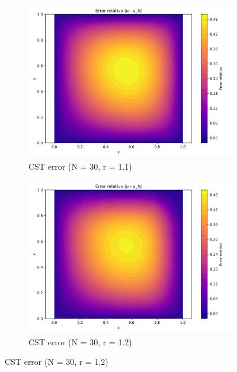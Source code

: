 \documentclass[12pt]{article}
\begin{document}
\begin{figure}[H]
    \centering
    \begin{subfigure}[t]{0.32\textwidth}
        \centering
        \includegraphics[width=\textwidth]{Graficos/31/CST_relative_error_colormap.png}
        \caption{CST error (N = 30, r = 1.1)}
        \label{fig:cst_error_r1.1_n30}
    \end{subfigure}
    \hfill
    \begin{subfigure}[t]{0.32\textwidth}
        \centering
        \includegraphics[width=\textwidth]{Graficos/32/CST_relative_error_colormap.png}
        \caption{CST error (N = 30, r = 1.2)}
        \label{fig:cst_error_r1.2_n30}
    \end{subfigure}

\end{figure}
\end{document}
